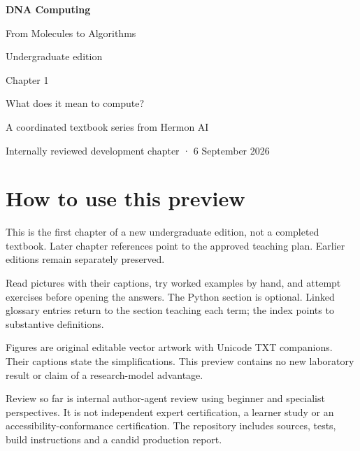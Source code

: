 \documentclass[11pt,oneside,openany]{book}
\begin{document}
\frontmatter
\begin{titlepage}
\color{BookBlue}\sffamily
\vspace*{20mm}
{\Huge\bfseries DNA Computing\par}
\vspace{8mm}
{\Large From Molecules to Algorithms\par}
\vspace{20mm}
{\large Undergraduate edition\par}
{\LARGE Chapter 1\par}
\vspace{10mm}
{\large What does it mean to compute?\par}
\vfill
{\normalsize A coordinated textbook series from Hermon AI\par}
\vspace{5mm}
{\small Internally reviewed development chapter · 6 September 2026\par}
\end{titlepage}
\chapter*{How to use this preview}
This is the first chapter of a new undergraduate edition, not a completed textbook. Later chapter references point to the approved teaching plan. Earlier editions remain separately preserved.

Read pictures with their captions, try worked examples by hand, and attempt exercises before opening the answers. The Python section is optional. Linked glossary entries return to the section teaching each term; the index points to substantive definitions.

Figures are original editable vector artwork with Unicode TXT companions. Their captions state the simplifications. This preview contains no new laboratory result or claim of a research-model advantage.

Review so far is internal author-agent review using beginner and specialist perspectives. It is not independent expert certification, a learner study or an accessibility-conformance certification. The repository includes sources, tests, build instructions and a candid production report.
\tableofcontents
\mainmatter

\backmatter
\printnoidxglossary[title={Chapter 1 glossary},style=altlist,nonumberlist]

\clearpage
{}
{}
\printindex
\end{document}
